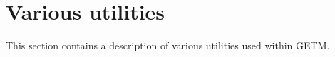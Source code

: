 
\section{Various utilities}

This section contains a description of various utilities used within GETM.

\vspace{0.5cm}

